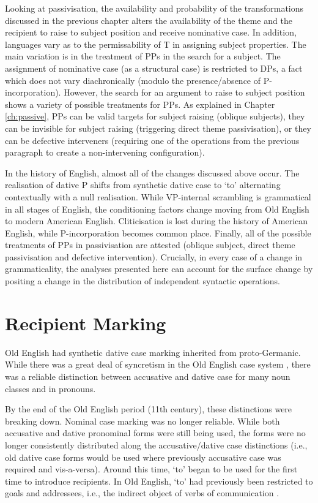 	Looking at passivisation, the availability and probability of the transformations discussed in the previous chapter alters the availability of the theme and the recipient to raise to subject position and receive nominative case. In addition, languages vary as to the permissability of T in assigning subject properties. The main variation is in the treatment of PPs in the search for a subject. The assignment of nominative case (as a structural case) is restricted to DPs, a fact which does not vary diachronically (modulo the presence/absence of P-incorporation). However, the search for an argument to raise to subject position shows a variety of possible treatments for PPs. As explained in Chapter \ref{ch:passive}, PPs can be valid targets for subject raising (oblique subjects), they can be invisible for subject raising (triggering direct theme passivisation), or they can be defective interveners (requiring one of the operations from the previous paragraph to create a non-intervening configuration).

	In the history of English, almost all of the changes discussed above occur. The realisation of dative P shifts from synthetic dative case to `to' alternating contextually with a null realisation. While VP-internal scrambling is grammatical in all stages of English, the conditioning factors change moving from Old English to modern American English. Cliticisation is lost during the history of American English, while P-incorporation becomes common place. Finally, all of the possible treatments of PPs in passivisation are attested (oblique subject, direct theme passivisation and defective intervention). Crucially, in every case of a change in grammaticality, the analyses presented here can account for the surface change by positing a change in the distribution of independent syntactic operations.

\section{Recipient Marking}
	Old English had synthetic dative case marking inherited from proto-Germanic. While there was a great deal of syncretism in the Old English case system \citep{Allen.1999}, there was a reliable distinction between accusative and dative case for many noun classes and in pronouns.

	By the end of the Old English period (11th century), these distinctions were breaking down. Nominal case marking was no longer reliable. While both accusative and dative pronominal forms were still being used, the forms were no longer consistently distributed along the accusative/dative case distinctions (i.e., old dative case forms would be used where previously accusative case was required and vis-a-versa). Around this time, `to' began to be used for the first time to introduce recipients. In Old English, `to' had previously been restricted to goals and addressees, i.e., the indirect object of verbs of communication \citep{Allen.1999,McFadden.2002,OED.2013}. 

